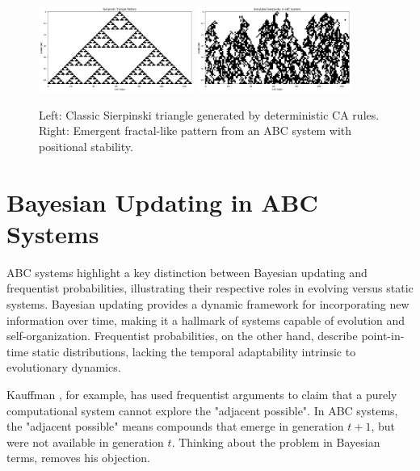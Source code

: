 \documentclass[entropy,article,submit,pdftex,moreauthors]{Definitions/mdpi}
\begin{document}
\begin{figure}[ht]
    \centering
    \includegraphics[width=0.45\textwidth]{sierpinski_actual.png}
    \includegraphics[width=0.45\textwidth]{sierpinski_simulated.png}
    \caption{Left: Classic Sierpinski triangle generated by deterministic CA rules. Right: Emergent fractal-like pattern from an ABC system with positional stability.}
    \label{fig:fractals}
\end{figure}


\section{Bayesian Updating in ABC Systems}

ABC systems highlight a key distinction between Bayesian \cite{mcgrayne2011theory} updating and frequentist probabilities, illustrating their respective roles in evolving versus static systems. Bayesian updating provides a dynamic framework for incorporating new information over time, making it a hallmark of systems capable of evolution and self-organization. Frequentist probabilities, on the other hand, describe point-in-time static distributions, lacking the temporal adaptability intrinsic to evolutionary dynamics.

Kauffman \cite{kauffman2000investigations}, for example, has used frequentist arguments to claim that a purely computational system cannot explore the "adjacent possible". In ABC systems, the "adjacent possible" means compounds that emerge in generation \(t+1\), but were not available in generation \(t\). Thinking about the problem in Bayesian terms, removes his objection.
\end{document}
